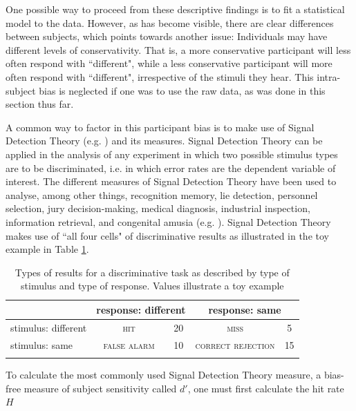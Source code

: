 One possible way to proceed from these descriptive findings is to fit a statistical model to the data. However, as has become visible, there are clear differences between subjects, which points towards another issue: Individuals may have different levels of conservativity. That is, a more conservative participant will less often respond with ``different", while a less conservative participant will more often respond with ``different", irrespective of the stimuli they hear. This intra-subject bias is neglected if one was to use the raw data, as was done in this section thus far.

A common way to factor in this participant bias is to make use of Signal Detection Theory (e.g. \cite{Macmillan1993,Macmillan2005}) and its measures. Signal Detection Theory can be applied in the analysis of any experiment in which two possible stimulus types are to be discriminated, i.e. in which error rates are the dependent variable of interest. The different measures of Signal Detection Theory have been used to analyse, among other things, recognition memory, lie detection, personnel selection, jury decision-making, medical diagnosis, industrial inspection, information retrieval, and congenital amusia (e.g. \cite{Stanislaw1999, Pfeifer2018}). Signal Detection Theory makes use of ``all four cells" of discriminative results as illustrated in the toy example in Table \ref{tab:6.9}.

\begin{table}\fontsize{10}{11}
\caption{Types of results for a discriminative task as described by type of stimulus and type of response. Values illustrate a toy example}
\label{tab:6.9}
\centering
\begin{tabular}{lcccc}
\lsptoprule
\textbf{~}          & \multicolumn{2}{c}{response: different} & \multicolumn{2}{c}{response: same}  \\
\midrule
stimulus: different & \textsc{hit}         & 20                        & \textsc{miss}              & 5               \\
stimulus: same      & \textsc{false alarm} & 10                        & \textsc{correct rejection} & 15              \\
\lspbottomrule
\end{tabular}
\end{table}

To calculate the most commonly used Signal Detection Theory measure, a bias-free measure of subject sensitivity called $d'$, one must first calculate the hit rate $H$

